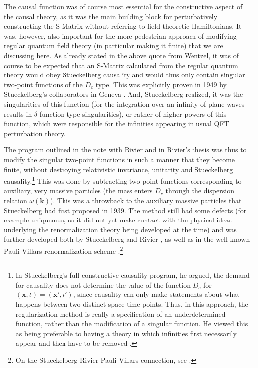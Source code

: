 \documentclass[12pt,a4paper]{article}
\begin{document}
The causal function was of course most essential for the constructive aspect of the causal theory, as it was the main building block for perturbatively constructing the S-Matrix without referring to field-theoretic Hamiltonians. It was, however, also important for the more pedestrian approach of modifying regular quantum field theory (in particular making it finite) that we are discussing here. As already stated in the above quote from Wentzel, it was of course to be expected that an S-Matrix calculated from the regular quantum theory would obey Stueckelberg causality and would thus only contain singular two-point functions of the $D_c$ type. This was explicitly proven in 1949 by Stueckelberg's collaborators in Geneva \citep{houriet_1949_classification}. And, Stueckelberg realized, it was the singularities of this function (for the integration over an infinity of plane waves results in $\delta$-function type singularities), or rather of higher powers of this function, which were responsible for the infinities appearing in usual QFT perturbation theory.

The program outlined in the note with Rivier and in Rivier's thesis was thus to modify the singular two-point functions in such a manner that they become finite, without destroying relativistic invariance, unitarity and Stueckelberg causality.\footnote{In Stueckelberg's full constructive causality program, he argued, the demand for causality does not determine the value of the function $D_c$ for $(\mathbf{x}, t) = (\mathbf{x}', t')$, since causality can only make statements about what happens between two distinct space-time points. Thus, in this approach, the regularization method is really a specification of an underdetermined function, rather than the modification of a singular function. He viewed this as being preferable to having a theory in which infinities first necessarily appear and then have to be removed \citep{stueckelberg_1950_causalite}.} This was done by subtracting two-point functions corresponding to auxiliary, very massive particles (the mass enters $D_c$ through the dispersion relation $\omega (\mathbf{k})$). This was a throwback to the auxiliary massive particles that Stueckelberg had first proposed in 1939. The method still had some defects (for example uniqueness, as it did not yet make contact with the physical ideas underlying the renormalization theory being developed at the time) and was further developed both by Stueckelberg and Rivier \citep{stueckelberg_1950_a-propos}, as well as in the well-known Pauli-Villars renormalization scheme \citep{pauli_1949_on-the-invariant}.\footnote{On the Stueckelberg-Rivier-Pauli-Villars connection, see \citep[pp. 582ff]{schweber_1994_qed}.}
\end{document}
